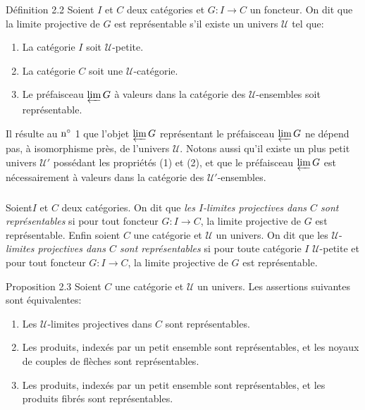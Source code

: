 \begin{enonce*}{Définition 2.2}
Soient $I$ et $C$ deux catégories et $G:I\rightarrow C$ un foncteur.
On dit que la limite projective de $G$ est représentable s'il existe
un univers $𝒰$ tel que:
\begin{enumerate}
\renewcommand{\labelenumi}{\theenumi)}
\item La catégorie $I$ soit $𝒰$-petite.

\item La catégorie $C$ soit une $𝒰$-catégorie.

\item Le préfaisceau $\varprojlim G$ à valeurs dans la
  catégorie des $𝒰$-ensembles soit représentable.
\end{enumerate}
\end{enonce*}

Il résulte au ${\rm n^\circ}$ 1 que l'objet $\varprojlim G$
représentant le préfaisceau $\varprojlim G$ ne dépend pas, à
isomorphisme près, de l'univers $𝒰$. Notons aussi qu'il
existe un plus petit univers $𝒰'$ possédant les propriétés
(1) et (2), et que le préfaisceau $\varprojlim G$ est nécessairement
à valeurs dans la catégorie des $𝒰'$-ensembles.

\setcounter{subsection}{2} \setcounter{subsubsection}{0}
\subsubsection{}
Soient\pageoriginale $I$ et $C$ deux catégories. On dit que
\emph{les $I$-limites projectives dans $C$ sont
  représentables} si pour tout foncteur $G:I\rightarrow C$, la
  limite projective de $G$ est représentable. Enfin soient $C$ une
  catégorie et $𝒰$ un univers. On dit que les
  $𝒰$-\emph{limites
  projectives dans $C$ sont représentables} si pour toute
  catégorie $I$ $𝒰$-petite et pour tout foncteur $G:I\rightarrow
  C$, la limite projective de $G$ est représentable.

\begin{enonce*}{Proposition 2.3}
Soient $C$ une catégorie et $𝒰$ un univers. Les assertions suivantes sont équivalentes:
\begin{enumerate}
\renewcommand{\theenumi}{\roman{enumi}}
\renewcommand{\labelenumi}{\theenumi)}
\item Les $𝒰$-limites projectives dans $C$ sont représentables.

\item Les produits, indexés par un petit ensemble sont
  représentables, et les noyaux de couples de flèches sont
  représentables.
\item Les produits, indexés par un petit ensemble sont
  représentables, et les produits fibrés sont représentables.
\end{enumerate}
\end{enonce*}

